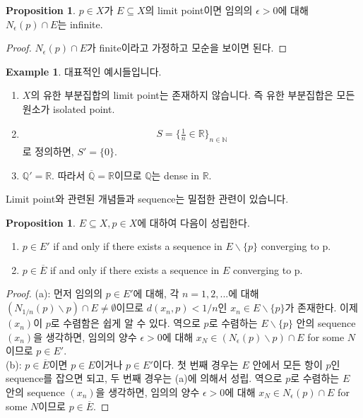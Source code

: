 \documentclass[12pt]{article}
\theoremstyle{definition}
\newtheorem{prop}[thm]{Proposition}
\newtheorem*{ex}{Example}
\def\NN{\mathbb{N}}
\def\QQ{\mathbb{Q}}
\def\RR{\mathbb{R}}
\def\eps{\epsilon}
\begin{document}
	\begin{prop}
		\(p \in X\)가 \(E \subseteq X\)의 limit point이면 임의의 \(\eps > 0\)에 대해 \(N_\eps (p) \cap E\)는 infinite.
	\end{prop}
	\begin{proof}
		\(N_\eps (p) \cap E\)가 finite이라고 가정하고 모순을 보이면 된다.
	\end{proof}

	\begin{ex}
		대표적인 예시들입니다.
		\begin{enumerate}[label=(\alph*), leftmargin=2\parindent]
			\item
			\(X\)의 유한 부분집합의 limit point는 존재하지 않습니다. 즉 유한 부분집합은 모든 원소가 isolated point.
			\item
			\begin{gather*}
				S = \{\frac{1}{n} \in \RR\}_{n \in \NN}
			\end{gather*}
			로 정의하면, \(S'=\{0\}\).
			\item
			\(\QQ' = \RR\). 따라서 \(\overline{\QQ} = \RR\)이므로 \(\QQ\)는 dense in \(\RR\).
		\end{enumerate}
	\end{ex}

Limit point와 관련된 개념들과 sequence는 밀접한 관련이 있습니다.

	\begin{prop} \label{prop limpt seq}
		\(E \subseteq X, p \in X\)에 대하여 다음이 성립한다.
		\begin{enumerate}[label=(\alph*), leftmargin=2\parindent]
			\item
			\(p \in E'\) if and only if there exists a sequence in \(E \backslash \{p\}\) converging to p.
			\item
			\(p \in \overline{E}\) if and only if there exists a sequence in \(E\) converging to p.
		\end{enumerate}
	\end{prop}

	\begin{proof}
		(a): 먼저 임의의 \(p \in E'\)에 대해, 각 \(n = 1, 2, ...\)에 대해 \((N_{1/n} (p) \backslash {p}) \cap E \neq \emptyset\)이므로 \(d(x_n, p) < 1/n\)인 \(x_n \in E \backslash \{p\}\)가 존재한다. 이제 \((x_n)\)이 \(p\)로 수렴함은 쉽게 알 수 있다. 역으로 \(p\)로 수렴하는 \(E \backslash \{p\}\) 안의 sequence \((x_n)\)을 생각하면, 임의의 양수 \(\eps > 0\)에 대해 \(x_N \in (N_\eps (p) \backslash {p}) \cap E\) for some \(N\)이므로 \(p \in E'\).\\
		(b): \(p \in \overline{E}\)이면 \(p \in E\)이거나 \(p \in E'\)이다. 첫 번째 경우는 \(E\) 안에서 모든 항이 \(p\)인 sequence를 잡으면 되고, 두 번째 경우는 (a)에 의해서 성립. 역으로 \(p\)로 수렴하는 \(E\) 안의 sequence \((x_n)\)을 생각하면, 임의의 양수 \(\eps > 0\)에 대해 \(x_N \in N_\eps (p) \cap E\) for some \(N\)이므로 \(p \in \overline{E}\).
	\end{proof}
\end{document}

